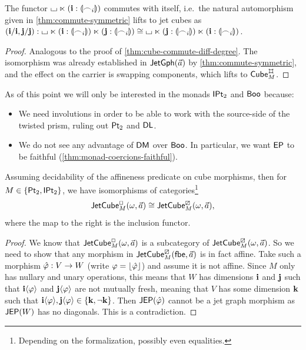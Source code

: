 \documentclass[a4paper]{memoir}
\begin{document}
\begin{proposition} \label{thm:cube-commute-symmetric}
	The functor ${\llcorner\hspace{-.4ex}\lrcorner} \ltimes (\mathbf{i} : {\llparenthesis \frown_i \rrparenthesis})$ commutes with itself, i.e.\ the natural automorphism given in \cref{thm:commute-symmetric} lifts to jet cubes as $(\mathbf{i} / \mathbf{i}, \mathbf{j} / \mathbf{j}) : {\llcorner\hspace{-.4ex}\lrcorner} \ltimes (\mathbf{i} : {\llparenthesis \frown_i \rrparenthesis}) \ltimes (\mathbf{j} : {\llparenthesis \frown_i \rrparenthesis}) \cong {\llcorner\hspace{-.4ex}\lrcorner} \ltimes (\mathbf{j} : {\llparenthesis \frown_i \rrparenthesis}) \ltimes (\mathbf{i} : {\llparenthesis \frown_i \rrparenthesis})$.
\end{proposition}
\begin{proof}
	Analogous to the proof of \cref{thm:cube-commute-diff-degree}.
	The isomorphism was already established in $\mathsf{JetGph}(\vec a)$ by \cref{thm:commute-symmetric}, and the effect on the carrier is swapping components, which lifts to $\cubecat_M^\mycubex$.
\end{proof}
\begin{remark} \label{rem:two-monads}
	As of this point we will only be interested in the monads ${\mathsf{IPt}_2}$ and $\mathsf{Boo}$ because:
	\begin{itemize}
		\item We need involutions in order to be able to work with the source-side of the twisted prism, ruling out ${\mathsf{Pt}_2}$ and $\mathsf{DL}$.
		\item We do not see any advantage of $\mathsf{DM}$ over $\mathsf{Boo}$. In particular, we want $\mathsf{EP}$ to be faithful (\cref{thm:monad-coercions-faithful}).
	\end{itemize}
\end{remark}
\begin{theorem} \label{thm:affine-automatic}
	Assuming decidability of the affineness predicate on cube morphisms, then for $M \in \mathopen{}\left\{ {\mathsf{Pt}_2}, {\mathsf{IPt}_2} \right\}\mathclose{}$, we have isomorphisms of categories\footnote{Depending on the formalization, possibly even equalities.}
	\[
		\mathsf{JetCube}^{\Box}_{M}(\omega,\vec a) \cong \mathsf{JetCube}^{\boxslash}_{M}(\omega,\vec a),
	\]
	where the map to the right is the inclusion functor.
\end{theorem}
\begin{proof}
	We know that $\mathsf{JetCube}^{\Box}_{M}(\omega,\vec a)$ is a subcategory of $\mathsf{JetCube}^{\boxslash}_{M}(\omega,\vec a)$.
	So we need to show that any morphism in $\mathsf{JetCube}^{\boxslash}_{M}({\mathsf{fbe}},\vec a)$ is in fact affine.
	Take such a morphism $\hat {\varphi} : V \to W$ (write $\varphi = \mathopen{}\left\lfloor \hat {\varphi} \right\rfloor\mathclose{}$) and assume it is not affine.
	Since $M$ only has nullary and unary operations, this means that $W$ has dimensions $\mathbf{i}$ and $\mathbf{j}$ such that $\mathbf{i} \langle \varphi \rangle$ and $\mathbf{j} \langle \varphi \rangle$ are not mutually fresh, meaning that $V$ has some dimension $\mathbf{k}$ such that $\mathbf{i} \langle \varphi \rangle, \mathbf{j} \langle \varphi \rangle \in \mathopen{}\left\{ \mathbf{k}, \lnot \mathbf{k} \right\}\mathclose{}$.
	Then $\mathsf{JEP}(\hat {\varphi})$ cannot be a jet graph morphism as $\mathsf{JEP}(W)$ has no diagonals. This is a contradiction.
\end{proof}
\end{document}
